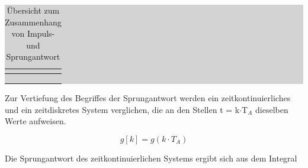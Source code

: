 \begin{table}[H]
\setlength{\arrayrulewidth}{.1em}
\caption{\"{U}bersicht zum Zusammenhang von Impuls- und Sprungantwort}
\setlength{\fboxsep}{0pt}%
\colorbox{lightgray}{%
%
\begin{tabular}{| c | c | c |}
\hline
\parbox[c][0.3in][c]{1.9in}{\smallskip\centering\textbf{\selectfont{Eigenschaft}}} & 
\parbox[c][0.3in][c]{2.2in}{\smallskip\centering\textbf{\selectfont{Zeitbereich}}} &
\parbox[c][0.3in][c]{2.2in}{\smallskip\centering\textbf{\selectfont{z-Bereich}}}\\ \hline


\parbox[c][0.5in][c]{1.9in}{} & 
\parbox[c][0.5in][c]{2.2in}{} &
\parbox[c][0.5in][c]{2.2in}{}\\
\hline

\parbox[c][0.5in][c]{1.9in}{} & 
\parbox[c][0.5in][c]{2.2in}{} &
\parbox[c][0.5in][c]{2.2in}{}\\
\hline

\parbox[c][0.5in][c]{1.9in}{} & 
\parbox[c][0.5in][c]{2.2in}{} &
\parbox[c][0.5in][c]{2.2in}{}\\
\hline

\end{tabular}%
}
\label{tab:sixfour}
\end{table}

\noindent Zur Vertiefung des Begriffes der Sprungantwort werden ein zeitkontinuierliches und ein zeitdiskretes System verglichen, die an den Stellen t = k$\cdot$T${}_{A}$ dieselben Werte aufweisen.

\begin{equation}\label{eq:sixfourty}
g\left[k\right]=g\left(k\cdot T_{A} \right)
\end{equation}

\noindent Die Sprungantwort des zeitkontinuierlichen Systems ergibt sich aus dem Integral 

